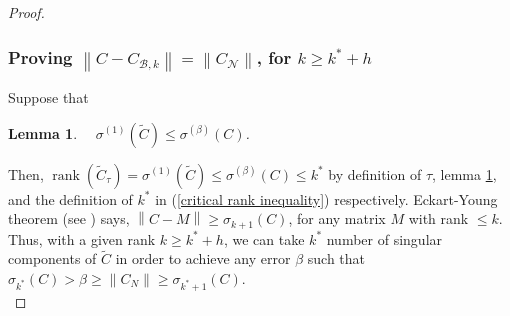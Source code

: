 \documentclass[11pt]{article}
\newcommand{\rank}{\operatorname{rank}}
\newtheorem{lemma}[theorem]{Lemma}
\newcommand{\norm}[1]{\left\|#1\right\|}
\newcommand{\B}{\mathcal{B}}
\newcommand{\N}{\mathcal{N}}
\begin{document}
\begin{proof}
\subsubsection{Proving $\norm{C - C_{\B, k}} = \norm{C_{\N}}$, for $k \geq k^* + h$}
Suppose that
\begin{lemma}\label{lambda plus}
 $\quad \sigma^{(1)}(\tilde{C}) \leq \sigma^{(\beta)}({C})$.
\end{lemma}
\noindent Then, $\rank(\tilde{C}_{\tau}) = \sigma^{(1)}(\tilde{C}) \leq \sigma^{(\beta)}({C}) \leq k^*$ by definition of $\tau$, lemma \ref{lambda plus}, and the definition of $k^*$ in (\ref{critical rank inequality}) respectively.
%
%
%
Eckart-Young theorem (see \cite{HJ}) says,  $\norm{C - M} \geq \sigma_{k+1}(C)$, for any matrix $M$ with rank $\leq k$.\\
 Thus, with a given rank $k \geq k^* + h$, we can take $k^*$ number of singular components of $\tilde{C}$ in order to achieve any error $\beta$ such that $ \sigma_{k^*}(C) > \beta \geq \norm{C_N} \geq \sigma_{k^*+1}(C)$.\\
%
\end{proof}
\end{document}
